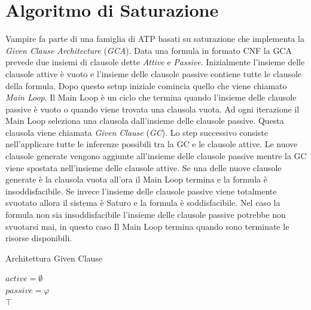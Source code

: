 \documentclass[./main.tex]{subfiles}
\begin{document}
\section{Algoritmo di Saturazione} \label{sec:vampire_saturazione}
Vampire fa parte di una famiglia di ATP basati su saturazione che implementa la \textit{Given Clause Architecture} (\textit{GCA}).
Data una formula in formato CNF la GCA prevede due insiemi di clausole dette \textit{Attive} e \textit{Passive}.
Inizialmente l'insieme delle clausole attive è vuoto e l'insieme delle clausole passive contiene tutte le clausole della formula.
Dopo questo setup iniziale comincia quello che viene chiamato \textit{Main Loop}.
Il Main Loop è un ciclo che termina quando l'insieme delle clausole passive è vuoto o quando viene trovata una clausola vuota.
Ad ogni iterazione il Main Loop seleziona una clausola dall'insieme delle clausole passive. 
Questa clausola viene chiamata \textit{Given Clause} (\textit{GC}). 
Lo step successivo consiste nell'applicare tutte le inferenze possibili tra la GC e le clausole attive.
Le nuove clausole generate vengono aggiunte all'insieme delle clausole passive mentre la GC viene spostata nell'insieme delle clausole attive.
Se una delle nuove clausole generate è la clausola vuota all'ora il Main Loop termina e la formula è insoddisfacibile.
Se invece l'insieme delle clausole passive viene totalmente svuotato allora il sistema è Saturo e la formula è soddisfacibile.
Nel caso la formula non sia insoddisfacibile l'insieme delle clausole passive potrebbe non svuotarsi mai,
in questo caso Il Main Loop termina quando sono terminate le risorse disponibili.

\begin{algorithm}[H]
    \caption{Architettura Given Clause}


    $active = \emptyset$ \\
    $passive = \varphi$ \\

    \Return $\top$\;
\end{algorithm}
\end{document}
